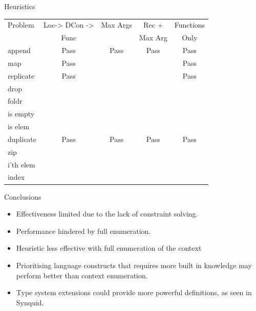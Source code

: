 \documentclass[presentation]{beamer}
\begin{document}
\begin{frame}[fragile]{Heuristics}
\begin{center}
\begin{tabular}{|l|c|c|c|c|}
  
\hline
Problem & Loc-> DCon -> & Max Args & Rec + & Functions \\
 & Func & & Max Arg & Only \\
\hline
append & Pass & Pass & Pass & Pass\\
map & Pass  & & & Pass\\
replicate & Pass & & & Pass\\
drop &   & & & \\
foldr &   & & & \\
is empty &   & & & \\
is elem &   &  & & \\
duplicate & Pass & Pass & Pass & Pass\\
zip &   & & & \\
i'th elem &  & & & \\ 
index &   &  & & \\
\hline
\end{tabular}
\end{center}
\end{frame}


\begin{frame}[fragile]{Conclusions}
  \begin{itemize}
  \item Effectiveness limited due to the lack of constraint solving.\\
  \item Performance hindered by full enumeration.\\
  \item Heuristic less effective with full enumeration of the context
  \item Prioritising language constructs that requires more built in knowledge may
    perform better than context enumeration.\\
  \item Type system extensions could provide more powerful definitions, as seen in Synquid.   
  \end{itemize}
\end{frame}
\end{document}
